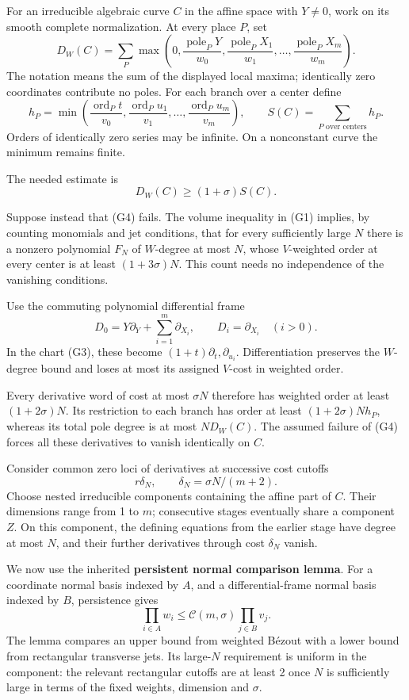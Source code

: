 \documentclass[11pt]{article}
\begin{document}
For an irreducible algebraic curve \(C\) in the affine space with
\(Y\ne0\), work on its smooth complete normalization. At every place
\(P\), set \[
D_W(C)=\sum_P
\max\left(0,\frac{\operatorname{pole}_P Y}{w_0},
\frac{\operatorname{pole}_P X_1}{w_1},\ldots,
\frac{\operatorname{pole}_P X_m}{w_m}\right).
\] The notation means the sum of the displayed local maxima; identically
zero coordinates contribute no poles. For each branch over a center
define \[
h_P=\min\left(\frac{\operatorname{ord}_P t}{v_0},
\frac{\operatorname{ord}_P u_1}{v_1},\ldots,
\frac{\operatorname{ord}_P u_m}{v_m}\right),\qquad
S(C)=\sum_{P\text{ over centers}}h_P.
\] Orders of identically zero series may be infinite. On a nonconstant
curve the minimum remains finite.

The needed estimate is \[
D_W(C)\ge(1+\sigma)S(C).
\tag{G4}
\]

Suppose instead that (G4) fails. The volume inequality in (G1) implies,
by counting monomials and jet conditions, that for every sufficiently
large \(N\) there is a nonzero polynomial \(F_N\) of \(W\)-degree at
most \(N\), whose \(V\)-weighted order at every center is at least
\((1+3\sigma)N\). This count needs no independence of the vanishing
conditions.

Use the commuting polynomial differential frame \[
D_0=Y\partial_Y+\sum_{i=1}^m\partial_{X_i},
\qquad D_i=\partial_{X_i}\quad(i>0).
\] In the chart (G3), these become \((1+t)\partial_t,\partial_{u_i}\).
Differentiation preserves the \(W\)-degree bound and loses at most its
assigned \(V\)-cost in weighted order.

Every derivative word of cost at most \(\sigma N\) therefore has
weighted order at least \((1+2\sigma)N\). Its restriction to each branch
has order at least \((1+2\sigma)Nh_P\), whereas its total pole degree is
at most \(ND_W(C)\). The assumed failure of (G4) forces all these
derivatives to vanish identically on \(C\).

Consider common zero loci of derivatives at successive cost cutoffs \[
r\delta_N,\qquad \delta_N=\sigma N/(m+2).
\] Choose nested irreducible components containing the affine part of
\(C\). Their dimensions range from 1 to \(m\); consecutive stages
eventually share a component \(Z\). On this component, the defining
equations from the earlier stage have degree at most \(N\), and their
further derivatives through cost \(\delta_N\) vanish.

We now use the inherited \textbf{persistent normal comparison lemma}.
For a coordinate normal basis indexed by \(A\), and a differential-frame
normal basis indexed by \(B\), persistence gives \[
\prod_{i\in A}w_i\le
\mathcal C(m,\sigma)\prod_{j\in B}v_j.
\tag{G5}
\] The lemma compares an upper bound from weighted Bézout with a lower
bound from rectangular transverse jets. Its large-\(N\) requirement is
uniform in the component: the relevant rectangular cutoffs are at least
2 once \(N\) is sufficiently large in terms of the fixed weights,
dimension and \(\sigma\).
\end{document}
